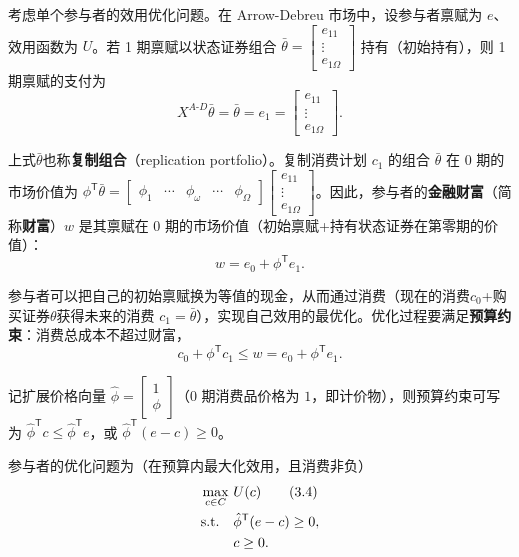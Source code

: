 \begin{tcolorbox}[knowledge,title=3.4 参与者的优化]
考虑单个参与者的效用优化问题。在 Arrow-Debreu 市场中，设参与者禀赋为 $e$、效用函数为 $U$。若 1 期禀赋以状态证券组合 $\bar{\theta}=\begin{bmatrix}e_{11} \\ \vdots \\ e_{1\Omega}\end{bmatrix}$ 持有（初始持有），则 1 期禀赋的支付为
\[
    X^{A\text{-}D}\bar{\theta}=\bar{\theta}=e_1=
    \begin{bmatrix}e_{11} \\ \vdots \\ e_{1\Omega}\end{bmatrix}.
\]

上式$\bar{\theta}$也称\textbf{复制组合}（replication portfolio）。复制消费计划 $c_1$ 的组合 $\bar{\theta}$ 在 0 期的市场价值为 $\phi^{\mathsf T}\bar{\theta}=\begin{bmatrix}
    \phi_1 & \cdots & \phi_{\omega} & \cdots & \phi_{\Omega}
\end{bmatrix}\begin{bmatrix}e_{11} \\ \vdots \\ e_{1\Omega}\end{bmatrix}$。因此，参与者的\textbf{金融财富}（简称\textbf{财富}）$w$ 是其禀赋在 0 期的市场价值（初始禀赋+持有状态证券在第零期的价值）：
\[
    w=e_0+\phi^{\mathsf T}e_1.
    \tag{3.2}
\]

参与者可以把自己的初始禀赋换为等值的现金，从而通过消费（现在的消费$c_0$+购买证券$\theta$获得未来的消费 $c_1=\bar{\theta}$），实现自己效用的最优化。优化过程要满足\textbf{预算约束}：消费总成本不超过财富，
\[
    c_0+\phi^{\mathsf T}c_1\le w=e_0+\phi^{\mathsf T}e_1.
    \tag{3.3}
\]

记扩展价格向量 $\hat{\phi}=\begin{bmatrix}1 \\ \phi\end{bmatrix}$（0 期消费品价格为 $1$，即计价物），则预算约束可写为 $\hat{\phi}^{\mathsf T}c\le\hat{\phi}^{\mathsf T}e$，或 $\hat{\phi}^{\mathsf T}(e-c)\ge 0$。

参与者的优化问题为（在预算内最大化效用，且消费非负）
\begin{align}
    \max_{c\in C}\ &U(c) \tag{3.4}\\
    \mathrm{s.t.}\quad &\hat{\phi}^{\mathsf T}(e-c)\ge 0, \notag\\
    &c\ge 0. \notag
\end{align}


\end{tcolorbox}
